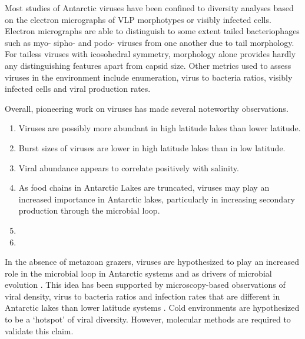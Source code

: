 Most studies of Antarctic viruses have been confined to diversity analyses based on the electron micrographs of \ac{VLP} morphotypes or visibly infected cells. 
Electron micrographs are able to distinguish to some extent tailed bacteriophages such as myo- sipho- and podo- viruses from one another due to tail morphology.
For tailess viruses with icosohedral symmetry, morphology alone provides hardly any distinguishing features apart from capsid size.
Other metrics used to assess viruses in the environment include enumeration, virus to bacteria ratios, visibly infected cells and viral production rates.

Overall, pioneering work on viruses has made several noteworthy observations. 
\begin{enumerate}
\item Viruses are possibly more abundant in high latitude lakes than lower latitude.
\item Burst sizes of viruses are lower in high latitude lakes than in low latitude.
\item Viral abundance appears to correlate positively with salinity.
\item As food chains in Antarctic Lakes are truncated, viruses may play an increased importance in Antarctic lakes, particularly in increasing secondary production through the microbial loop.
\item %
\item %
\end{enumerate}
In the absence of metazoan grazers, viruses are hypothesized to play an increased role in the microbial loop in Antarctic systems \cite{Kepner1998} and as drivers of microbial evolution \cite{Anesio2011}. 
This idea has been supported by microscopy-based observations of viral density, virus to bacteria ratios and infection rates that are different in Antarctic lakes than lower latitude systems \cite{Laybourn-Parry2001, Madan2005, Laybourn-Parry2007, Sawstrom2007}. 
Cold environments are hypothesized to be a `hotspot' of viral diversity.
However, molecular methods are required to validate this claim.


